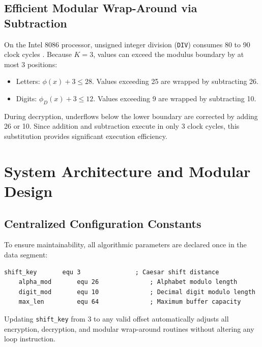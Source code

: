 \documentclass[11pt,a4paper]{article}
\begin{document}
\subsection{Efficient Modular Wrap-Around via Subtraction}
On the Intel 8086 processor, unsigned integer division (\texttt{DIV}) consumes 80 to 90 clock cycles \cite{intel1979}. Because $K = 3$, values can exceed the modulus boundary by at most 3 positions:
\begin{itemize}
    \item Letters: $\phi(x) + 3 \le 28$. Values exceeding 25 are wrapped by subtracting 26.
    \item Digits: $\phi_D(x) + 3 \le 12$. Values exceeding 9 are wrapped by subtracting 10.
\end{itemize}
During decryption, underflows below the lower boundary are corrected by adding 26 or 10. Since addition and subtraction execute in only 3 clock cycles, this substitution provides significant execution efficiency.

\section{System Architecture and Modular Design}

\subsection{Centralized Configuration Constants}
To ensure maintainability, all algorithmic parameters are declared once in the data segment:
\begin{lstlisting}[style=asmcode,caption={Centralized configuration constants in CAESAR.ASM}]
    shift_key       equ 3               ; Caesar shift distance
    alpha_mod       equ 26              ; Alphabet modulo length
    digit_mod       equ 10              ; Decimal digit modulo length
    max_len         equ 64              ; Maximum buffer capacity
\end{lstlisting}
Updating \texttt{shift\_key} from 3 to any valid offset automatically adjusts all encryption, decryption, and modular wrap-around routines without altering any loop instruction.
\end{document}
